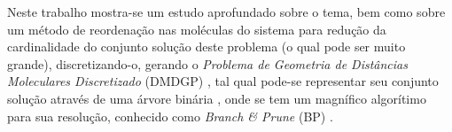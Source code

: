 \documentclass[a4paper,12pt]{article}
\begin{document}
	Neste trabalho mostra-se um estudo aprofundado sobre o tema, bem como sobre um método de reordenação nas moléculas do sistema para redução da cardinalidade do conjunto solução deste problema \cite{carlile:MinimalOrder} (o qual pode ser muito grande), discretizando-o, gerando o \textit{Problema de Geometria de Distâncias Moleculares Discretizado} (DMDGP) \cite{carlile:DDGP}, tal qual pode-se representar seu conjunto solução através de uma árvore binária \cite{fidalgotese}, onde se tem um magnífico algorítimo para sua resolução, conhecido como \textit{Branch \& Prune} (BP) \cite{fidalgotese}.
	
	
	
	
	
\end{document}
